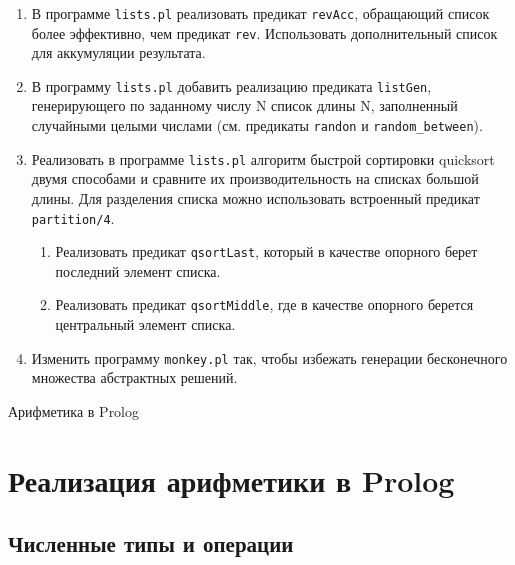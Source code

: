\begin{frame}
	
	\frametitle{\insertsection}
	
	\begin{enumerate}
		\item В программе \texttt{lists.pl} реализовать предикат \texttt{revAcc}, обращающий список более эффективно, чем
		предикат \texttt{rev}. Использовать дополнительный список для аккумуляции результата.
		\item В программу \texttt{lists.pl} добавить реализацию предиката \texttt{listGen}, генерирующего по заданному числу N
		список длины N, заполненный случайными целыми числами (см. предикаты \texttt{randon} и \texttt{random\_between}).
		\item Реализовать в программе \texttt{lists.pl} алгоритм быстрой сортировки quicksort двумя способами и сравните их
		производительность на списках большой длины. Для разделения списка можно использовать встроенный предикат \texttt{partition/4}.
		\begin{enumerate}
			\item Реализовать предикат \texttt{qsortLast}, который в качестве опорного берет последний элемент списка.
			\item Реализовать предикат \texttt{qsortMiddle}, где в качестве опорного берется центральный элемент списка.
		\end{enumerate}
		\item Изменить программу \texttt{monkey.pl} так, чтобы избежать генерации бесконечного множества
		абстрактных решений.
	\end{enumerate}
	
\end{frame}






\begin{frame}
	
	\begin{center}
		\Huge Арифметика в Prolog
	\end{center}
	
\end{frame}


\section{Реализация арифметики в Prolog}
\subsection{Численные типы и операции}

